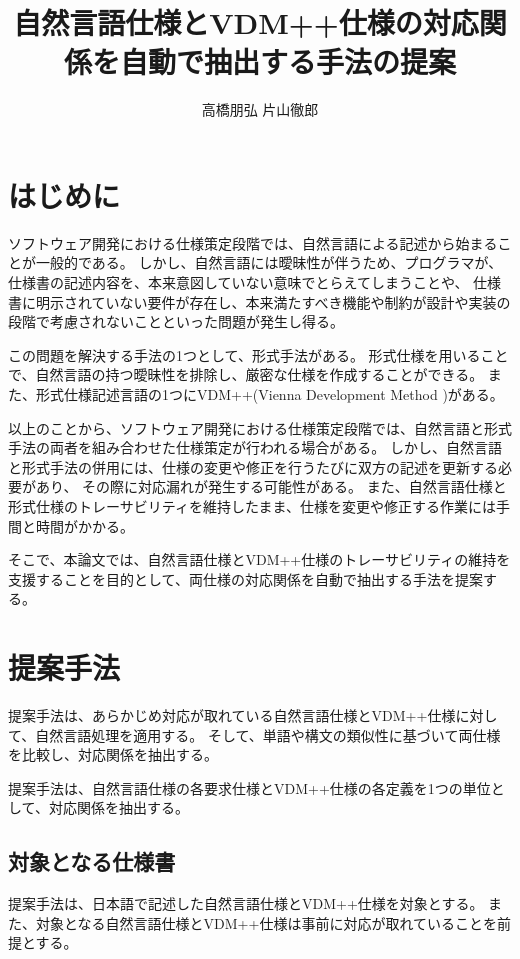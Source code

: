 \documentclass[a4j,twocolumn,10pt]{jceee-kyushu-euc}
\title{
      自然言語仕様とVDM++仕様の対応関係を自動で抽出する手法の提案\newline
}
\author{
高橋朋弘 片山徹郎\\
}
\affiliation{
宮崎大学大学院 工学研究科 工学専攻\\
}
\begin{document}
\maketitle



\section{はじめに}
ソフトウェア開発における仕様策定段階では、自然言語による記述から始まることが一般的である。%
しかし、自然言語には曖昧性が伴うため、プログラマが、仕様書の記述内容を、本来意図していない意味でとらえてしまうことや、
仕様書に明示されていない要件が存在し、本来満たすべき機能や制約が設計や実装の段階で考慮されないことといった問題が発生し得る\cite{spec_introduction}。

この問題を解決する手法の1つとして、形式手法がある\cite{successful_example}。
形式仕様を用いることで、自然言語の持つ曖昧性を排除し、厳密な仕様を作成することができる。
また、形式仕様記述言語の1つにVDM++(Vienna Development Method \cite{vdm})がある。%

以上のことから、ソフトウェア開発における仕様策定段階では、自然言語と形式手法の両者を組み合わせた仕様策定が行われる場合がある。
しかし、自然言語と形式手法の併用には、仕様の変更や修正を行うたびに双方の記述を更新する必要があり、
その際に対応漏れが発生する可能性がある。
また、自然言語仕様と形式仕様のトレーサビリティを維持したまま、仕様を変更や修正する作業には手間と時間がかかる。

そこで、本論文では、自然言語仕様とVDM++仕様のトレーサビリティの維持を支援することを目的として、両仕様の対応関係を自動で抽出する手法を提案する。

\section{提案手法}
提案手法は、あらかじめ対応が取れている自然言語仕様とVDM++仕様に対して、自然言語処理を適用する。
そして、単語や構文の類似性に基づいて両仕様を比較し、対応関係を抽出する。

提案手法は、自然言語仕様の各要求仕様とVDM++仕様の各定義を1つの単位として、対応関係を抽出する。

\subsection{対象となる仕様書}
提案手法は、日本語で記述した自然言語仕様とVDM++仕様を対象とする。
また、対象となる自然言語仕様とVDM++仕様は事前に対応が取れていることを前提とする。
\end{document}
